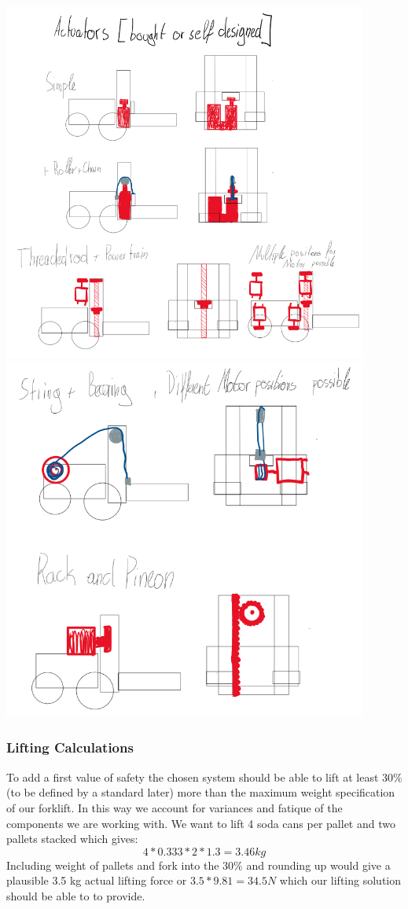 \documentclass[../report.tex]{subfiles}
\begin{document}
\begin{center}
    \includegraphics[width=0.9\textwidth]{../image/Liftsolutions1.png}
    \includegraphics[width=0.9\textwidth]{../image/Liftsolutions2.png}
\end{center}
\subsubsection{Lifting Calculations}
To add a first value of safety the chosen system should be able to lift at least 30\% (to be defined by a standard later) more than the maximum weight
specification of our forklift. In this way we account for variances and fatique of the components we are working 
with.
We want to lift 4 soda cans per pallet and two pallets stacked which gives:
\[ 4*0.333*2*1.3=3.46kg\]
Including weight of pallets and fork into the 30\% and rounding up would give a plausible 3.5 kg actual lifting force or
\(3.5*9.81=34.5N\) which our lifting solution should be able to to provide.
\end{document}
